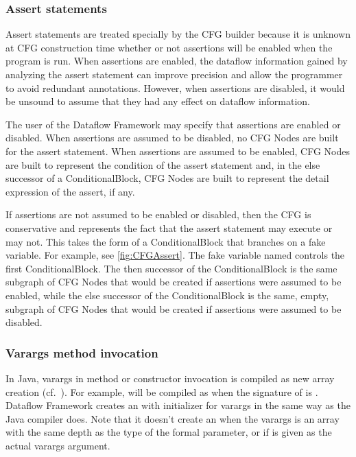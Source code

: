 \subsubsection{Assert statements}
\label{sec:assert-stmts}

Assert statements are treated specially by the CFG builder because it
is unknown at CFG construction time whether or not assertions will be
enabled when the program is run.  When assertions are enabled, the
dataflow information gained by analyzing the assert statement can
improve precision and allow the programmer to avoid redundant
annotations.  However, when assertions are disabled, it would be
unsound to assume that they had any effect on dataflow information.

The user of the Dataflow Framework may specify that
assertions are enabled or disabled.  When assertions are assumed to be
disabled, no CFG Nodes are built for the assert statement.
When assertions are assumed to be enabled, CFG Nodes are built to
represent the condition of the assert statement and, in the else
successor of a ConditionalBlock, CFG Nodes are built to represent the
detail expression of the assert, if any.

If assertions are not assumed to be enabled or disabled, then
the CFG is conservative and represents the fact that the
assert statement may execute or may not.  This takes the form of a
ConditionalBlock that branches on a fake variable.  For example, see
\autoref{fig:CFGAssert}.  The fake variable named
 controls the first ConditionalBlock.
The then successor of the ConditionalBlock is the same subgraph of CFG
Nodes that would be created if assertions were assumed to be enabled,
while the else successor of the ConditionalBlock is the same, empty,
subgraph of CFG Nodes that would be created if assertions were assumed
to be disabled.



\subsubsection{Varargs method invocation}
\label{sec:varargs}
In Java, varargs in method or constructor invocation is compiled
as new array creation (cf.\ ). For example,
 will be compiled as 
when the signature of  is . Dataflow
Framework creates an  with initializer for varargs
in the same way as the Java compiler does.
Note that it doesn't create an 
when the varargs is an array with the same depth as the type of
the formal parameter, or if  is given as the actual varargs argument.

